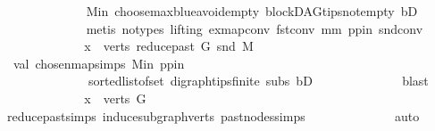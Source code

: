 \begin{isabellebody}
\ \ \ \ \ \ \ \ \ \ \ \ \isamarkupfalse%
\ M{\isacharunderscore}{\kern0pt}in\ choose{\isacharunderscore}{\kern0pt}max{\isacharunderscore}{\kern0pt}blue{\isacharunderscore}{\kern0pt}avoid{\isacharunderscore}{\kern0pt}empty\ blockDAG{\isachardot}{\kern0pt}tips{\isacharunderscore}{\kern0pt}not{\isacharunderscore}{\kern0pt}empty\ bD\isanewline
\ \ \ \ \ \ \ \ \ \ \ \ \isamarkupfalse%
\ {\isacharparenleft}{\kern0pt}metis\ {\isacharparenleft}{\kern0pt}no{\isacharunderscore}{\kern0pt}types{\isacharcomma}{\kern0pt}\ lifting{\isacharparenright}{\kern0pt}\ ex{\isacharunderscore}{\kern0pt}map{\isacharunderscore}{\kern0pt}conv\ fst{\isacharunderscore}{\kern0pt}conv\ mm\ pp{\isacharunderscore}{\kern0pt}in\ snd{\isacharunderscore}{\kern0pt}conv{\isacharparenright}{\kern0pt}\ \isanewline
\ \ \ \ \ \ \ \ \ \ \isamarkupfalse%
\ \isamarkupfalse%
\ {\isachardoublequoteopen}x\ {\isasymin}\ verts\ {\isacharparenleft}{\kern0pt}reduce{\isacharunderscore}{\kern0pt}past\ G\ {\isacharparenleft}{\kern0pt}snd\ M{\isacharparenright}{\kern0pt}{\isacharparenright}{\kern0pt}{\isachardoublequoteclose}\ \isamarkupfalse%
\ {}\ val\ chosen{\isacharunderscore}{\kern0pt}map{\isacharunderscore}{\kern0pt}simps\ M{\isacharunderscore}{\kern0pt}in\ pp{\isacharunderscore}{\kern0pt}in\ \isanewline
\ \ \ \ \ \ \ \ \ \ \ \ \ \ sorted{\isacharunderscore}{\kern0pt}list{\isacharunderscore}{\kern0pt}of{\isacharunderscore}{\kern0pt}set{\isacharparenleft}{\kern0pt}{}{\isacharparenright}{\kern0pt}\ digraph{\isachardot}{\kern0pt}tips{\isacharunderscore}{\kern0pt}finite\ subs\ bD\isanewline
\ \ \ \ \ \ \ \ \ \ \ \ \isamarkupfalse%
\ blast\ \isanewline
\ \ \ \ \ \ \ \ \ \ \isamarkupfalse%
\ \isamarkupfalse%
\ {\isachardoublequoteopen}x\ {\isasymin}\ verts\ G{\isachardoublequoteclose}\ \isamarkupfalse%
\ reduce{\isacharunderscore}{\kern0pt}past{\isachardot}{\kern0pt}simps\ induce{\isacharunderscore}{\kern0pt}subgraph{\isacharunderscore}{\kern0pt}verts\ past{\isacharunderscore}{\kern0pt}nodes{\isachardot}{\kern0pt}simps\isanewline
\ \ \ \ \ \ \ \ \ \ \ \ \isamarkupfalse%
\ auto\isanewline
\ \ \ \ \ \ \ \ \isamarkupfalse%
\isanewline
\ \ \ \ \ \ \isamarkupfalse%
\ \isanewline
\ \ \ \ \isamarkupfalse%
\isanewline
\ \ \isamarkupfalse%
\isanewline
{}\isamarkupfalse%
%
\endisatagproof
{\isafoldproof}%
%
\isadelimproof
\isanewline
%
\endisadelimproof

\end{isabellebody}
